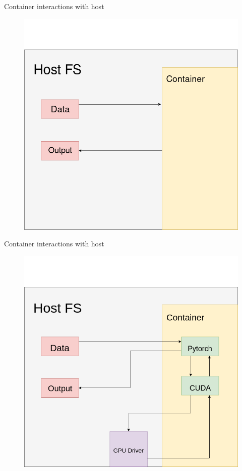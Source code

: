 \documentclass[10pt]{beamer}              %
\begin{document}
\begin{frame}[fragile]{Container interactions with host}
    \begin{figure}[c]
    \includegraphics[scale=0.30]{media/images/workshop-diagrams-Host-concept-3-simple.png}
    \end{figure}
\end{frame}

\begin{frame}[fragile]{Container interactions with host}
    \begin{figure}[c]
    \includegraphics[scale=0.30]{media/images/workshop-diagrams-Host-concept-3.png}
    \end{figure}
\end{frame}
\end{document}
